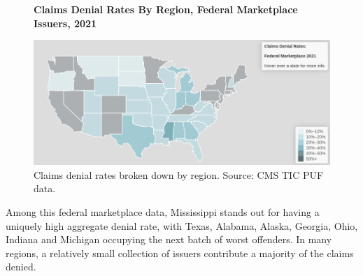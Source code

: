 \documentclass[12pt, a4paper]{report}
\begin{document}
\begin{figure}
	\centering
	\textbf{Claims Denial Rates By Region, Federal Marketplace Issuers, 2021}\par\medskip
	\includegraphics[width=0.85\columnwidth]{images/cms_puf/federal_denial_rates.png}
	\caption{Claims denial rates broken down by region. Source: CMS TIC PUF data.}
	\label{federal_denial_map}
\end{figure}

Among this federal marketplace data, Mississippi stands out for having a uniquely high aggregate denial rate, with Texas, Alabama, Alaska, Georgia, Ohio, Indiana and Michigan occupying the next batch of worst offenders. In many regions, a relatively small collection of issuers contribute a majority of the claims denied.\\
\end{document}
